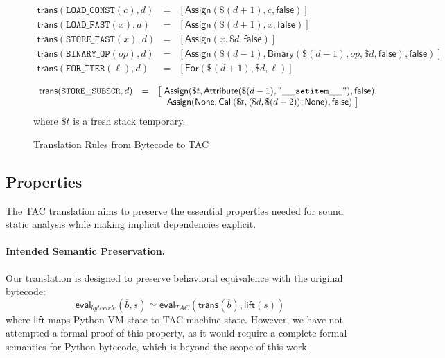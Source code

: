 \begin{figure*}[t]
\centering
\[
\begin{array}{rcl}
\mathsf{trans}(\mathtt{LOAD\_CONST}(c), d) 
  &=& [\mathsf{Assign}(\$(d+1), c, \mathsf{false})] \\[1ex]

\mathsf{trans}(\mathtt{LOAD\_FAST}(x), d) 
  &=& [\mathsf{Assign}(\$(d+1), x, \mathsf{false})] \\[1ex]

\mathsf{trans}(\mathtt{STORE\_FAST}(x), d) 
  &=& [\mathsf{Assign}(x, \$d, \mathsf{false})] \\[1ex]

\mathsf{trans}(\mathtt{BINARY\_OP}(op), d) 
  &=& [\mathsf{Assign}(\$(d-1), \mathsf{Binary}(\$(d-1), op, \$d, \mathsf{false}), \mathsf{false})] \\[1ex]

\mathsf{trans}(\mathtt{FOR\_ITER}(\ell), d) 
  &=& [\mathsf{For}(\$(d+1), \$d, \ell)]
\end{array}
\]

\[
\begin{array}{rcl}
\mathsf{trans}(\mathtt{STORE\_SUBSCR}, d) 
  &=& \big[ \;
     \mathsf{Assign}(\$t, \mathsf{Attribute}(\$(d-1),\mathtt{"\_\_setitem\_\_"}), \mathsf{false}), \\ 
  && \quad \mathsf{Assign}(\mathsf{None}, 
             \mathsf{Call}(\$t, \langle \$d, \$(d-2)\rangle, \mathsf{None}), \mathsf{false}) 
     \;\big]
\end{array}
\]
where $\$t$ is a fresh stack temporary.

\caption{Translation Rules from Bytecode to TAC}
\label{fig:translation-rules}
\end{figure*}

\subsection{Properties}

The TAC translation aims to preserve the essential properties needed for sound static analysis while making implicit dependencies explicit.

\paragraph{Intended Semantic Preservation.}
Our translation is designed to preserve behavioral equivalence with the original bytecode:
\[
\mathsf{eval}_{bytecode}(\overline{b}, s) \simeq \mathsf{eval}_{TAC}(\mathsf{trans}(\overline{b}), \mathsf{lift}(s))
\]
where $\mathsf{lift}$ maps Python VM state to TAC machine state. However, we have not attempted a formal proof of this property, as it would require a complete formal semantics for Python bytecode, which is beyond the scope of this work.

